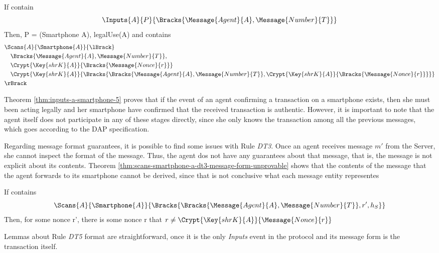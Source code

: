 \begin{theorem}
  \label{thm:inputs-a-smartphone-5}
  If  contain
  \[\Inputs{A}{P}{\Bracks{\Message{Agent}{A}, \Message{Number}{T}}}\]
  Then, P = (Smartphone A), legalUse(A) and  contains
  \begin{align*}
    & \Scans{A}{\Smartphone{A}}{\lBrack} \\
      & \quad \Bracks{\Message{Agent}{A}, \Message{Number}{T}}, \\
      & \quad \Crypt{\Key{shrK}{A}}{\Bracks{\Message{Nonce}{r}}} \\
      & \quad \Crypt{\Key{shrK}{A}}{\Bracks{\Bracks{\Message{Agent}{A}, \Message{Number}{T}},\Crypt{\Key{shrK}{A}}{\Bracks{\Message{Nonce}{r}}}}} \\
    & \rBrack
  \end{align*}
\end{theorem}

Theorem \ref{thm:inputs-a-smartphone-5} proves that if the event of an agent confirming a transaction on a smartphone exists, then she must been acting legally and her smartphone have confirmed that the received transaction is authentic. However, it is important to note that the agent itself does not participate in any of these stages directly, since she only knows the transaction among all the previous messages, which goes according to the DAP specification.

Regarding message format guarantees, it is possible to find some issues with Rule \textit{DT3}. Once an agent receives message \(m'\) from the Server, she cannot inspect the format of the message. Thus, the agent dos not have any guarantees about that message, that is, the message is not explicit about its contents. Theorem \ref{thm:scans-smartphone-a-dt3-message-form-unprovable} shows that the contents of the message that the agent forwards to its smartphone cannot be derived, since that is not conclusive what each message entity representes

\begin{theorem}
\label{thm:scans-smartphone-a-dt3-message-form-unprovable}
  If  contains
  \[\Scans{A}{\Smartphone{A}}{\Bracks{\Bracks{\Message{Agent}{A}, \Message{Number}{T}}, r', h_S}}\]
  Then, for some nonce r', there is some nonce r that $r \neq \Crypt{\Key{shrK}{A}}{\Message{Nonce}{r}}$
\end{theorem}

Lemmas about Rule \textit{DT5} format are straightforward, once it is the only \textit{Inputs} event in the protocol and its message form is the transaction itself.


